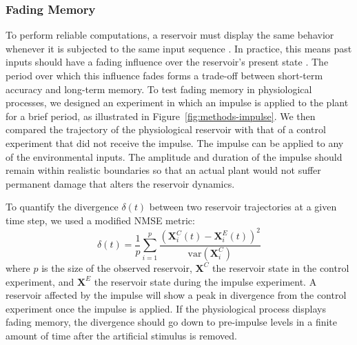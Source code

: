 \documentclass[10pt,a4paper,journal]{IEEEtran}
\begin{document}
\subsubsection{Fading Memory}

To perform reliable computations, a reservoir must display the same behavior whenever it is subjected to the same input sequence \cite{nakajima_physical_2020}.
In practice, this means past inputs should have a fading influence over the reservoir's present state \cite{lukosevicius_reservoir_2012}.
The period over which this influence fades forms a trade-off between short-term accuracy and long-term memory.
To test fading memory in physiological processes, we designed an experiment in which an impulse is applied to the plant for a brief period, as illustrated in \mbox{Figure \ref{fig:methods-impulse}}.
We then compared the trajectory of the physiological reservoir with that of a control experiment that did not receive the impulse. 
The impulse can be applied to any of the environmental inputs.
The amplitude and duration of the impulse should remain within realistic boundaries so that an actual plant would not suffer permanent damage that alters the reservoir dynamics.

To quantify the divergence $\delta(t)$ between two reservoir trajectories at a given time step, we used a modified NMSE metric:
\begin{equation} \label{eq:divergence}
    \delta(t) = \frac{1}{p} \sum_{i=1}^{p} \frac{\left( \mathbf{X}_i^{C}(t) - \mathbf{X}_i^{E}(t) \right)^{2}}{\text{var}\left( \mathbf{X}_i^{C} \right)}
\end{equation}
where $p$ is the size of the observed reservoir, $\mathbf{X}^{C}$ the reservoir state in the control experiment, and $\mathbf{X}^{E}$ the reservoir state during the impulse experiment.
A reservoir affected by the impulse will show a peak in divergence from the control experiment once the impulse is applied.
If the physiological process displays fading memory, the divergence should go down to pre-impulse levels in a finite amount of time after the artificial stimulus is removed. 
\end{document}
